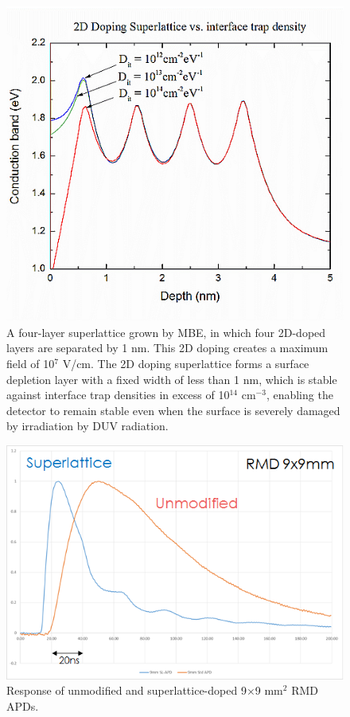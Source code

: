 \begin{figure}[h!]
\centering
\includegraphics[width=0.9\linewidth]{Figures/delta.png}
\caption{A four-layer superlattice grown by MBE, in
which four 2D-doped layers are separated by 1 nm. This 2D doping creates a maximum field of 10$^7$ V/cm. The 2D doping superlattice forms a surface
depletion layer with a fixed width of less than 1 nm, which is stable against interface trap densities in excess of
10$^{14}$ cm$^{-3}$, enabling the detector to remain stable even when the surface is severely damaged by irradiation by DUV radiation. }
\label{fig:delta}
\end{figure}
\begin{figure}[h!]
\centering
\includegraphics[width=0.9\linewidth]{Figures/timing.png}
\caption{Response of unmodified and superlattice-doped 9$\times$9 mm$^2$ RMD APDs. }
\label{fig:timing}
\end{figure}

